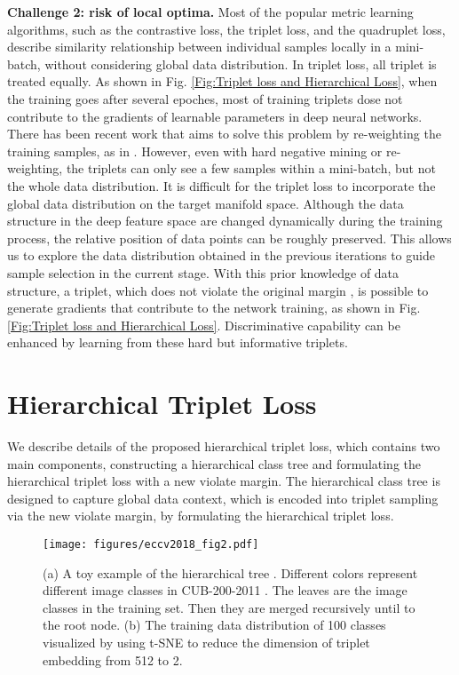 \documentclass[runningheads]{llncs}
\begin{document}
\noindent\textbf{Challenge 2: risk of local optima.} Most of the popular metric learning algorithms, such as the contrastive loss, the triplet loss, and the quadruplet loss, describe similarity relationship between individual samples locally in a mini-batch, without considering global data distribution. In triplet loss, all triplet is treated equally. As shown in Fig. \ref{Fig:Triplet loss and Hierarchical Loss}, when the training goes after several epoches, most of training triplets dose not contribute to the gradients of learnable parameters in deep neural networks. There has been recent work that aims to solve this problem by re-weighting the training samples, as in \cite{wu2017sampling}. However, even with hard negative mining or re-weighting, the triplets can only see a few samples within a mini-batch, but not the whole data distribution. It is difficult for the triplet loss to incorporate the global data distribution on the target manifold space.
Although the data structure in the deep feature space are changed dynamically during the training process, the relative position of data points can be roughly preserved. This allows us to explore the data distribution obtained in the previous iterations to guide sample selection in the current stage. With this prior knowledge of data structure, a triplet, which does not violate the original margin ,  is possible to generate gradients that contribute to the network training, as shown in Fig. \ref{Fig:Triplet loss and Hierarchical Loss}. Discriminative capability can be enhanced by learning from these hard but informative triplets.



 	\section{Hierarchical Triplet Loss}

We describe details of the proposed hierarchical triplet loss, which contains two main components, constructing a hierarchical class tree and formulating the hierarchical triplet loss with a new violate margin. The hierarchical class tree is designed to capture global data context, which is encoded into triplet sampling via the new violate margin, by formulating the hierarchical triplet loss.


\begin{figure*}[ht]
  \centering
  \texttt{[image: figures/eccv2018\_fig2.pdf]}
  \caption{(a) A toy example of the hierarchical tree . Different colors represent different image classes in CUB-200-2011 \cite{wah2011caltech}. The leaves are the image classes in the training set. Then they are merged recursively until to the root node. (b) The training data distribution of 100 classes visualized by using t-SNE \cite{maaten2008visualizing} to reduce the dimension of triplet embedding from 512 to 2.}
  \label{Fig:Hierarchical Tree}
\end{figure*}
\end{document}
